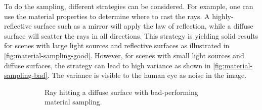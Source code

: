 To do the sampling, different strategies can be considered. For example, one can use the material properties to determine where to cast the rays. A highly-reflective surface such as a mirror will apply the law of reflection, while a diffuse surface will scatter the rays in all directions. This strategy is yielding solid results for scenes with large light sources and reflective surfaces as illustrated in \autoref{fig:material-sampling-good}. However, for scenes with small light sources and diffuse surfaces, the strategy can lead to high variance as shown in \autoref{fig:material-sampling-bad}. The variance is visible to the human eye as noise in the image.

\begin{figure}[H]
  \centering
  \begin{subfigure}[t]{0.45\textwidth}
    \caption{Ray hitting a diffuse surface with bad-performing material sampling.}
    \label{fig:material-sampling-bad}
  \end{subfigure}
  \hfill
  \begin{subfigure}[t]{0.45\textwidth}
\end{subfigure}
\end{figure}
